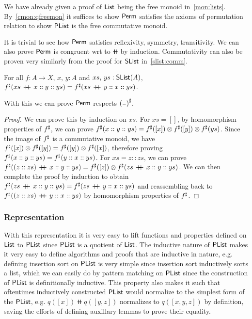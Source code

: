 We have already given a proof of $\operatorname{\mathsf{List}}$ being the free monoid in~\ref{mon:lists}.
By~\ref{cmon:qfreemon} it suffices to show $\operatorname{\mathsf{Perm}}$ satisfies the axioms of permutation relation
to show $\operatorname{\mathsf{PList}}$ is the free commutative monoid.

It is trivial to see how $\operatorname{\mathsf{Perm}}$ satisfies reflexivity, symmetry, transitivity.
We can also prove $\operatorname{\mathsf{Perm}}$ is congruent wrt to $\doubleplus$ by induction.
Commutativity can also be proven very similarly from the proof for $\operatorname{\mathsf{SList}}$ in~\ref{slist:comm}.

\begin{theorem}\label{plist:sharp-sat}
    For all $f : A \to X$, $x, \, y : A$ and $xs, \, ys : \operatorname{\mathsf{SList}}(A)$,
    ${f}^{\sharp}(xs\,\mathbin{+\kern -0.4em+}\,x :: y :: ys) = {f}^{\sharp}(xs\,\mathbin{+\kern -0.4em+}\,y :: x :: ys)$.
\end{theorem}

With this we can prove $\operatorname{\mathsf{Perm}}$ respects ${({\scriptstyle{-}})}^{\sharp}$.

\begin{proof}
We can prove this by induction on $xs$. For $xs = []$, by homomorphism properties of ${f}^{\sharp}$,
we can prove ${f}^{\sharp}(x :: y :: ys) = {f}^{\sharp}([ x ]) \otimes {f}^{\sharp}([ y ]) \otimes {f}^{\sharp}(ys)$.
Since the image of ${f}^{\sharp}$ is a commutative monoid, we have
${f}^{\sharp}([ x ]) \otimes {f}^{\sharp}([ y ]) = {f}^{\sharp}([ y ]) \otimes {f}^{\sharp}([ x ])$, therefore proving
${f}^{\sharp}(x :: y :: ys) = {f}^{\sharp}(y :: x :: ys)$. For $xs = z :: zs$, we can prove
${f}^{\sharp}((z :: zs)\,\mathbin{+\kern -0.4em+}\,x :: y :: ys) = {f}^{\sharp}([ z ]) \otimes {f}^{\sharp}(zs\,\mathbin{+\kern -0.4em+}\,x :: y :: ys)$.
We can then complete the proof by induction to obtain
${f}^{\sharp}(zs\,\mathbin{+\kern -0.4em+}\,x :: y :: ys) = {f}^{\sharp}(zs\,\mathbin{+\kern -0.4em+}\,y :: x :: ys)$ and reassembling
back to ${f}^{\sharp}((z :: zs)\,\mathbin{+\kern -0.4em+}\,y :: x :: ys)$ by homomorphism properties of ${f}^{\sharp}$.
\end{proof}

\subsubsection{Representation}\label{plist:rep}
With this representation it is very easy to lift functions and properties defined on $\operatorname{\mathsf{List}}$
to $\operatorname{\mathsf{PList}}$ since $\operatorname{\mathsf{PList}}$ is a quotient of $\operatorname{\mathsf{List}}$. The inductive nature of $\operatorname{\mathsf{PList}}$ makes it
very easy to define algorithms and proofs that are inductive in nature, e.g. defining insertion sort
on $\operatorname{\mathsf{PList}}$ is very simple since insertion sort inductively sorts a list, which we can easily do by
pattern matching on $\operatorname{\mathsf{PList}}$ since the construction of $\operatorname{\mathsf{PList}}$ is definitionally inductive.
This property also makes it such that oftentimes inductively constructed $\operatorname{\mathsf{PList}}$ would normalize to the
simplest form of the $\operatorname{\mathsf{PList}}$, e.g. $q([ x ]) \doubleplus q([y, z])$ normalizes to $q([x,y,z])$ by
definition, saving the efforts of defining auxillary lemmas to prove their equality.

